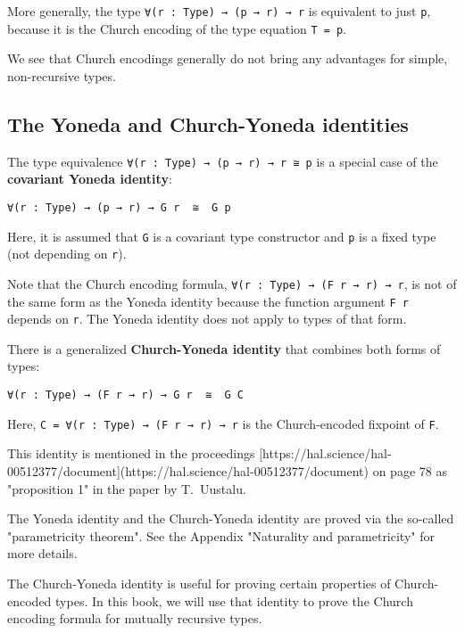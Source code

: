 More generally, the type \lstinline!∀(r : Type) → (p → r) → r! is equivalent to just \lstinline!p!, because it is the Church encoding of the type equation \lstinline!T = p!.


We see that Church encodings generally do not bring any advantages for simple, non-recursive types.


\subsection{The Yoneda and Church-Yoneda identities}


The type equivalence \lstinline!∀(r : Type) → (p → r) → r ≅ p! is a special case of the \textbf{covariant Yoneda identity}:


\begin{lstlisting}[language=Dhall]
∀(r : Type) → (p → r) → G r  ≅  G p
\end{lstlisting}


Here, it is assumed that \lstinline!G! is a covariant type constructor and \lstinline!p! is a fixed type (not depending on \lstinline!r!).


Note that the Church encoding formula, \lstinline!∀(r : Type) → (F r → r) → r!, is not of the same form as the Yoneda identity because the function argument \lstinline!F r! depends on \lstinline!r!.
The Yoneda identity does not apply to types of that form.


There is a generalized \textbf{Church-Yoneda identity} that combines both forms of types:


\begin{lstlisting}[language=Dhall]
∀(r : Type) → (F r → r) → G r  ≅  G C
\end{lstlisting}


Here, \lstinline!C = ∀(r : Type) → (F r → r) → r! is the Church-encoded fixpoint of \lstinline!F!.


This identity is mentioned in the proceedings [https://hal.science/hal-00512377/document](https://hal.science/hal-00512377/document) on page 78 as "proposition 1" in the paper by T. Uustalu.


The Yoneda identity and the Church-Yoneda identity are proved via the so-called "parametricity theorem".
See the Appendix "Naturality and parametricity" for more details.


The Church-Yoneda identity is useful for proving certain properties of Church-encoded types.
In this book, we will use that identity to prove the Church encoding formula for mutually recursive types.


